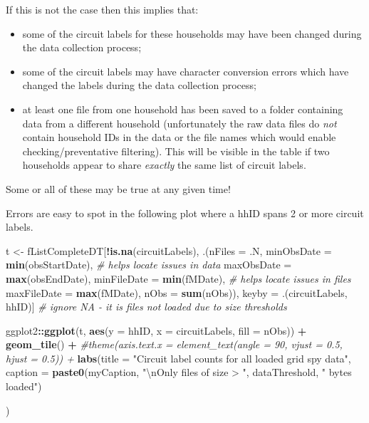 \documentclass[]{article}
\newenvironment{Shaded}{\begin{snugshade}}{\end{snugshade}}
\newcommand{\KeywordTok}[1]{\textcolor[rgb]{0.13,0.29,0.53}{\textbf{#1}}}
\newcommand{\DataTypeTok}[1]{\textcolor[rgb]{0.13,0.29,0.53}{#1}}
\newcommand{\CharTok}[1]{\textcolor[rgb]{0.31,0.60,0.02}{#1}}
\newcommand{\StringTok}[1]{\textcolor[rgb]{0.31,0.60,0.02}{#1}}
\newcommand{\CommentTok}[1]{\textcolor[rgb]{0.56,0.35,0.01}{\textit{#1}}}
\newcommand{\OperatorTok}[1]{\textcolor[rgb]{0.81,0.36,0.00}{\textbf{#1}}}
\newcommand{\NormalTok}[1]{#1}
\providecommand{\tightlist}{%
  \setlength{\itemsep}{0pt}\setlength{\parskip}{0pt}}
\begin{document}
If this is not the case then this implies that:

\begin{itemize}
\tightlist
\item
  some of the circuit labels for these households may have been changed
  during the data collection process;
\item
  some of the circuit labels may have character conversion errors which
  have changed the labels during the data collection process;
\item
  at least one file from one household has been saved to a folder
  containing data from a different household (unfortunately the raw data
  files do \emph{not} contain household IDs in the data or the file
  names which would enable checking/preventative filtering). This will
  be visible in the table if two households appear to share
  \emph{exactly} the same list of circuit labels.
\end{itemize}

Some or all of these may be true at any given time!

Errors are easy to spot in the following plot where a hhID spans 2 or
more circuit labels.

\begin{Shaded}
\begin{Highlighting}[]
\NormalTok{t <-}\StringTok{ }\NormalTok{fListCompleteDT[}\OperatorTok{!}\KeywordTok{is.na}\NormalTok{(circuitLabels), .(}\DataTypeTok{nFiles =}\NormalTok{ .N,}
                                              \DataTypeTok{minObsDate =} \KeywordTok{min}\NormalTok{(obsStartDate), }\CommentTok{# helps locate issues in data}
                                              \DataTypeTok{maxObsDate =} \KeywordTok{max}\NormalTok{(obsEndDate),}
                                              \DataTypeTok{minFileDate =} \KeywordTok{min}\NormalTok{(fMDate), }\CommentTok{# helps locate issues in files}
                                              \DataTypeTok{maxFileDate =} \KeywordTok{max}\NormalTok{(fMDate),}
                                              \DataTypeTok{nObs =} \KeywordTok{sum}\NormalTok{(nObs)),}
\NormalTok{                     keyby =}\StringTok{ }\NormalTok{.(circuitLabels, hhID)] }\CommentTok{# ignore NA - it is files not loaded due to size thresholds}

\NormalTok{ggplot2}\OperatorTok{::}\KeywordTok{ggplot}\NormalTok{(t, }\KeywordTok{aes}\NormalTok{(}\DataTypeTok{y =}\NormalTok{ hhID, }\DataTypeTok{x =}\NormalTok{ circuitLabels, }\DataTypeTok{fill =}\NormalTok{ nObs)) }\OperatorTok{+}
\StringTok{  }\KeywordTok{geom_tile}\NormalTok{() }\OperatorTok{+}
\StringTok{  }\CommentTok{#theme(axis.text.x = element_text(angle = 90, vjust = 0.5, hjust = 0.5)) + }
\StringTok{  }\KeywordTok{labs}\NormalTok{(}\DataTypeTok{title =} \StringTok{"Circuit label counts for all loaded grid spy data"}\NormalTok{,}
       \DataTypeTok{caption =} \KeywordTok{paste0}\NormalTok{(myCaption,}
                        \StringTok{"}\CharTok{\textbackslash{}n}\StringTok{Only files of size > "}\NormalTok{, dataThreshold, }\StringTok{" bytes loaded"}\NormalTok{)}
       
\NormalTok{  )}
\end{Highlighting}
\end{Shaded}
\end{document}
